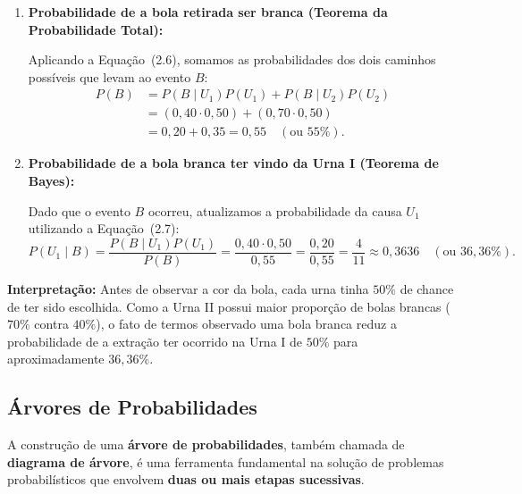 \begin{enumerate}
    \item[a)] \textbf{Probabilidade de a bola retirada ser branca (Teorema da Probabilidade Total):}
    
    Aplicando a Equação~(2.6), somamos as probabilidades dos dois caminhos possíveis que levam ao evento $B$:
    \begin{align*}
    P(B) &= P(B \mid U_1)P(U_1) + P(B \mid U_2)P(U_2) \\
         &= (0,40 \cdot 0,50) + (0,70 \cdot 0,50) \\
         &= 0,20 + 0,35 = 0,55 \quad (\text{ou } 55\%).
    \end{align*}

    \item[b)] \textbf{Probabilidade de a bola branca ter vindo da Urna I (Teorema de Bayes):}
    
    Dado que o evento $B$ ocorreu, atualizamos a probabilidade da causa $U_1$ utilizando a Equação~(2.7):
    \[
    P(U_1 \mid B) = \frac{P(B \mid U_1)P(U_1)}{P(B)} = \frac{0,40 \cdot 0,50}{0,55} = \frac{0,20}{0,55} = \frac{4}{11} \approx 0,3636 \quad (\text{ou } 36,36\%).
    \]
\end{enumerate}

\textbf{Interpretação:} Antes de observar a cor da bola, cada urna tinha $50\%$ de chance de ter sido escolhida. Como a Urna II possui maior proporção de bolas brancas ($70\%$ contra $40\%$), o fato de termos observado uma bola branca reduz a probabilidade de a extração ter ocorrido na Urna I de $50\%$ para aproximadamente $36,36\%$.
















\newpage
\subsection{Árvores de Probabilidades}

A construção de uma \textbf{árvore de probabilidades}, também chamada de
\textbf{diagrama de árvore}, é uma ferramenta fundamental na solução de problemas
probabilísticos que envolvem \textbf{duas ou mais etapas sucessivas}. \vskip0.3cm

